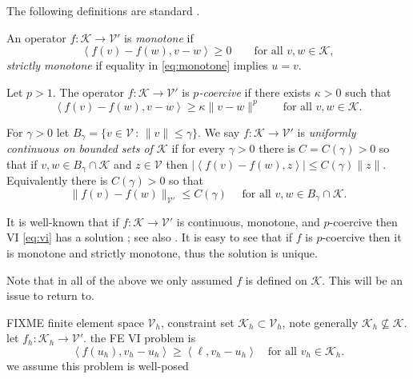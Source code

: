 \documentclass[hidelinks,onefignum,onetabnum,final]{siamart220329}  %
\newcommand{\cK}{\mathcal{K}}
\newcommand{\cV}{\mathcal{V}}
\newcommand{\ip}[2]{\left<#1,#2\right>}
\begin{document}
The following definitions are standard \cite[for example]{KinderlehrerStampacchia1980}.

\begin{definition}  An operator $f:\cK \to \cV'$ is \emph{monotone} if
\begin{equation}
\ip{f(v)-f(w)}{v-w} \ge 0 \qquad \text{for all } v,w \in \cK, \label{eq:monotone}
\end{equation}
\emph{strictly monotone} if equality in \eqref{eq:monotone} implies $u=v$.
\end{definition}

\begin{definition}  Let $p>1$.  The operator $f:\cK \to \cV'$ is \emph{$p$-coercive} if there exists $\kappa>0$ such that
\begin{equation}
\ip{f(v)-f(w)}{v-w} \ge \kappa \|v-w\|^p \qquad \text{for all } v,w \in \cK. \label{eq:pcoercive}
\end{equation}
\end{definition}

\begin{definition}  For $\gamma>0$ let $B_\gamma = \{v\in \cV\,:\,\|v\|\le \gamma\}$.  We say $f:\cK \to \cV'$ is \emph{uniformly continuous on bounded sets of $\cK$} if for every $\gamma>0$ there is $C=C(\gamma)>0$ so that if $v,w \in B_\gamma \cap \cK$ and $z\in\cV$ then $|\ip{f(v)-f(w)}{z}| \le C(\gamma) \|z\|$.  Equivalently there is $C(\gamma)>0$ so that
\begin{equation}
\|f(v)-f(w)\|_{\cV'} \le C(\gamma) \quad \text{ for all } v,w \in B_\gamma \cap \cK.  \label{eq:continuousonbounded}
\end{equation}
\end{definition}


It is well-known that if $f:\cK \to \cV'$ is continuous, monotone, and $p$-coercive then VI \eqref{eq:vi} has a solution \cite[Corollary III.1.8]{KinderlehrerStampacchia1980}; see also \cite{BuelerFarrell2024}.  It is easy to see that if $f$ is $p$-coercive then it is monotone and strictly monotone, thus the solution is unique.

Note that in all of the above we only assumed $f$ is defined on $\cK$.  This will be an issue to return to.

FIXME finite element space $\cV_h$, constraint set $\cK_h\subset \cV_h$, note generally $\cK_h \nsubseteq \cK$.  let $f_h:\cK_h\to\cV'$.  the FE VI problem is
\begin{equation}
\ip{f(u_h)}{v_h-u_h} \ge \ip{\ell}{v_h-u_h} \quad \text{for all } v_h\in \cK_h. \label{eq:fe:vi}
\end{equation}
we assume this problem is well-posed
\end{document}
